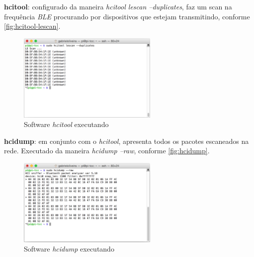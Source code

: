 \begin{alineas}
	\item \textbf{hcitool}: configurado da maneira \textit{hcitool lescan --duplicates}, faz um scan na frequência \textit{BLE} procurando por dispositivos que estejam transmitindo, conforme \autoref{fig:hcitool-lescan}.
	
	\begin{figure}[htb]
		\caption{\label{fig:hcitool-lescan}Software \textit{hcitool} executando}
		\begin{center}
			\includegraphics[width=0.6\textwidth]{img/hcitool-lescan.png}
		\end{center}
	\end{figure}

	\item \textbf{hcidump}: em conjunto com o \textit{hcitool}, apresenta todos os pacotes escaneados na rede. Executado da maneira \textit{hcidump --raw}, conforme \autoref{fig:hcidump}.
	
	\begin{figure}[htb]
		\caption{\label{fig:hcidump}Software \textit{hcidump} executando}
		\begin{center}
			\includegraphics[width=0.6\textwidth]{img/hcidump.png}
		\end{center}
	\end{figure}

\end{alineas}

